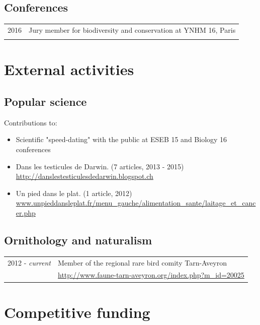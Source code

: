 \documentclass[a4paper,10pt]{article} %
\begin{document}
\subsection*{Conferences}
\begin{tabular}{p{4cm}|p{11cm}}
\hfill \textsc{2016} & Jury member for biodiversity and conservation at YNHM 16, Paris\\
\multicolumn{2}{c}{} \\
\end{tabular}

\section*{External activities}

\subsection*{Popular science}

Contributions to:
\begin{itemize}
	\item Scientific "speed-dating" with the public at ESEB 15 and Biology 16 conferences
\item Dans les testicules de Darwin. (7 articles, 2013 - 2015) \\ \url{http://danslestesticulesdedarwin.blogspot.ch}
\item Un pied dans le plat. (1 article, 2012) \\ \url{www.unpieddansleplat.fr/menu_gauche/alimentation_sante/laitage_et_cancer.php}
\end{itemize}

\subsection*{Ornithology and naturalism}
\begin{tabular}{p{4cm}|p{11cm}}
\hfill \textsc{2012 -} \emph{current} & Member of the regional rare bird comity Tarn-Aveyron\\
															& \url{http://www.faune-tarn-aveyron.org/index.php?m_id=20025}\\
\end{tabular}

\section*{Competitive funding}
\end{document}
